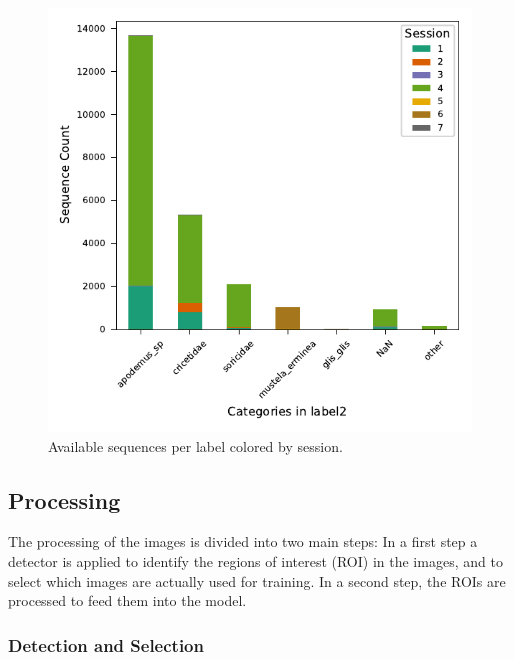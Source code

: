     \begin{figure}[ht]
    \centering
    \includegraphics{figures/label2_session.pdf}
    \caption{Available sequences per label colored by session.}
    \label{fig:sequenceperlabel}
    \end{figure}


    \subsection{Processing}

    The processing of the images is divided into two main steps: 
    In a first step a detector is applied to identify the regions of interest (ROI) in the images, and to select which images are actually used for training.
    In a second step, the ROIs are processed to feed them into the model.

        \subsubsection{Detection and Selection}

